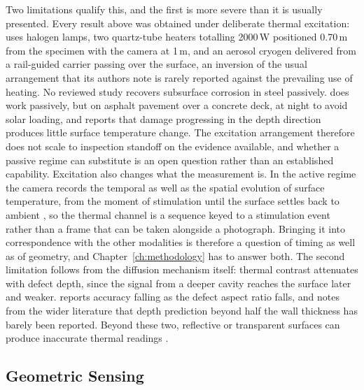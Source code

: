 Two limitations qualify this, and the first is more
severe than it is usually presented. Every result above was obtained under
deliberate thermal excitation: \citet{Lim2021} uses halogen lamps,
\citet{Elizalde2023} two quartz-tube heaters totalling 2000\,W positioned
0.70\,m from the specimen with the camera at 1\,m, and
\citet{Doshvarpassand2022} an aerosol cryogen delivered from a rail-guided
carrier passing over the surface, an inversion of the usual arrangement that its
authors note is rarely reported against the prevailing use of heating. No reviewed study recovers subsurface
corrosion in steel passively. \citet{Yamashita2025} does work passively, but on
asphalt pavement over a concrete deck, at night to avoid solar loading, and reports that damage
progressing in the depth direction produces little surface temperature change.
The excitation arrangement therefore does not scale to inspection standoff on
the evidence available, and whether a passive regime can substitute is an open
question rather than an established capability. Excitation also changes what the
measurement is. In the active regime the camera records the temporal as well as
the spatial evolution of surface temperature, from the moment of stimulation
until the surface settles back to ambient \citep{Doshvarpassand2022}, so the
thermal channel is a sequence keyed to a stimulation event rather than a frame
that can be taken alongside a photograph. Bringing it into correspondence with
the other modalities is therefore a question of timing as well as of geometry,
and Chapter~\ref{ch:methodology} has to answer both. The second limitation follows from the
diffusion mechanism itself: thermal contrast attenuates with defect depth, since
the signal from a deeper cavity reaches the surface later and weaker.
\citet{Doshvarpassand2022}
reports accuracy falling as the defect aspect ratio falls, and notes from the
wider literature that depth prediction beyond half the wall thickness has barely
been reported. Beyond these two, reflective or transparent surfaces can produce
inaccurate thermal readings \citep{Tran2024}.

\subsection{Geometric Sensing}
\label{sec:lr-geometric}

